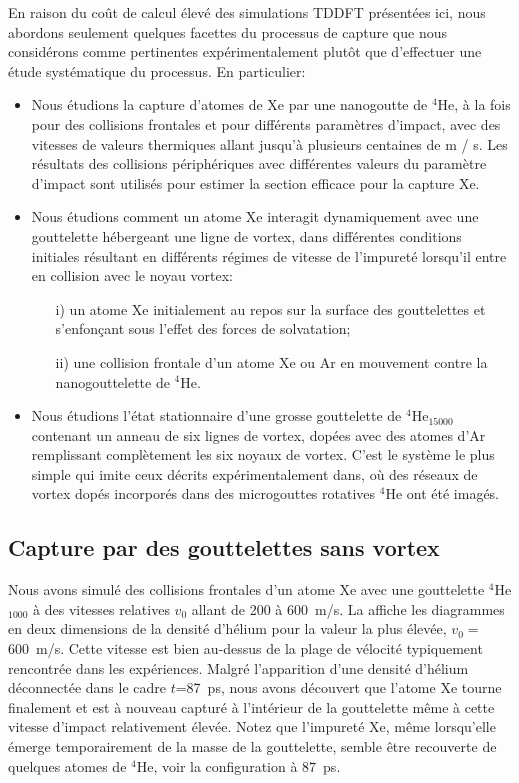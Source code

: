 		En raison du coût de calcul élevé des simulations TDDFT présentées ici, nous abordons seulement quelques facettes du processus de capture que nous considérons comme pertinentes expérimentalement plutôt que d'effectuer une étude systématique du processus. En particulier:
		\begin{itemize}
			\item Nous étudions la capture d'atomes de Xe par une nanogoutte de $^4$He, à la fois pour des collisions frontales et pour différents paramètres d'impact, avec des vitesses de valeurs thermiques allant jusqu'à plusieurs centaines de m / s. Les résultats des collisions périphériques avec différentes valeurs du paramètre d'impact sont utilisés pour estimer la section efficace pour la capture Xe.
			\item Nous étudions comment un atome Xe interagit dynamiquement avec une gouttelette hébergeant une ligne de vortex, dans différentes conditions initiales résultant en différents régimes de vitesse de l'impureté lorsqu'il entre en collision avec le noyau vortex:
			\begin{enumerate}
				\item[i)] un atome Xe initialement au repos sur la surface des gouttelettes et s'enfonçant sous l'effet des forces de solvatation;
				\item[ii)] une collision frontale d'un atome Xe ou Ar en mouvement contre la nanogouttelette de $^4$He.
			\end{enumerate}
			\item Nous étudions l'état stationnaire d'une grosse gouttelette de $^4$He$_{15000}$ contenant un anneau de six lignes de vortex, dopées avec des atomes d'Ar remplissant complètement les six noyaux de vortex. C'est le système le plus simple qui imite ceux décrits expérimentalement dans, où des réseaux de vortex dopés incorporés dans des microgouttes rotatives $^4$He ont été imagés.
		\end{itemize}

		\subsection*{Capture par des gouttelettes sans vortex}
			Nous avons simulé des collisions frontales d'un atome Xe avec une gouttelette $^4$He$_{1000}$ à des vitesses relatives $v_0$ allant de 200 à 600~m/s. La  affiche les diagrammes en deux dimensions de la densité d'hélium pour la valeur la plus élevée, $v_0\!=$600~m/s. Cette vitesse est bien au-dessus de la plage de vélocité typiquement rencontrée dans les expériences\citep{Gom11,Gom14,Jones2016}. Malgré l'apparition d'une densité d'hélium déconnectée dans le cadre $t$=87~ps, nous avons découvert que l'atome Xe tourne finalement et est à nouveau capturé à l'intérieur de la gouttelette même à cette vitesse d'impact relativement élevée. Notez que l'impureté Xe, même lorsqu'elle émerge temporairement de la masse de la gouttelette, semble être recouverte de quelques atomes de $^4$He, voir la configuration à 87~ps.

